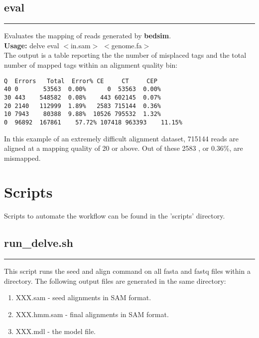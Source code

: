 \documentclass[11pt,a4paper,oneside]{book}
\begin{document}
\section{eval}
\rule[1cm]{\textwidth}{1pt}

Evaluates the mapping of reads generated by {\bf bedsim}.\\


{\bf Usage:} delve eval $<$in.sam$>$ $<$genome.fa$>$\\

The output is a table reporting the the number of misplaced tags and the total number of mapped tags within an alignment quality bin:
{\small
\begin{verbatim}
Q  Errors	Total  Error% CE     CT     CEP
40 0       53563  0.00%      0  53563  0.00%
30 443    548582  0.08%    443 602145  0.07%
20 2140   112999  1.89%   2583 715144  0.36%
10 7943    80388  9.88%  10526 795532  1.32%
0  96892  167861	57.72% 107418 963393	11.15%
\end{verbatim}
}

In this example of an extremely difficult alignment dataset, 715144 reads are aligned at a mapping quality of 20 or above. Out of these 2583 , or 0.36\%, are mismapped. 





\chapter*{ {\color{blue} Scripts}}
\setcounter{chapter}{4}
\setcounter{section}{0}

Scripts to automate the workflow can be found in the 'scripts' directory. 



\section{run\_delve.sh}
\rule[1cm]{\textwidth}{1pt}

This script runs the seed and align command on all fasta and fastq files within a directory. The following output files are generated in the same directory: \\

\begin{enumerate}
\item XXX.sam - seed alignments in SAM format.
\item XXX.hmm.sam - final alignments in SAM format.
\item XXX.mdl - the model file.
\end{enumerate}
\end{document}
